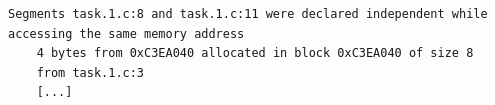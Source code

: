 \begin{minipage}{\linewidth}
\begin{lstlisting}[style=text, captionpos=b, caption={An error report from Taskgrind}, label={lst:error-report-taskgrind}]
	Segments task.1.c:8 and task.1.c:11 were declared independent while accessing the same memory address
	4 bytes from 0xC3EA040 allocated in block 0xC3EA040 of size 8
	from task.1.c:3
	[...]
\end{lstlisting}
\end{minipage}



